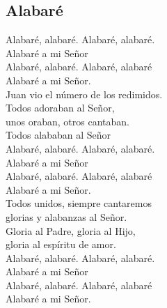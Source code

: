 \subsection{Alabaré}

\begin{center}

{\Large
Alabaré, alabaré. Alabaré, alabaré.\\
Alabaré a mi Señor\\
Alabaré, alabaré. Alabaré, alabaré\\
Alabaré a mi Señor.\\
\vspace{1em}
Juan vio el número de los redimidos.\\
Todos adoraban al Señor,\\
unos oraban, otros cantaban.\\
Todos alababan al Señor\\
\vspace{1em}
Alabaré, alabaré. Alabaré, alabaré.\\
Alabaré a mi Señor\\
Alabaré, alabaré. Alabaré, alabaré\\
Alabaré a mi Señor.\\
\vspace{1em}
Todos unidos, siempre cantaremos\\
glorias y alabanzas al Señor.\\
Gloria al Padre, gloria al Hijo,\\
gloria al espíritu de amor.\\
\vspace{1em}
Alabaré, alabaré. Alabaré, alabaré.\\
Alabaré a mi Señor\\
Alabaré, alabaré. Alabaré, alabaré\\
Alabaré a mi Señor.\\
}
\end{center}